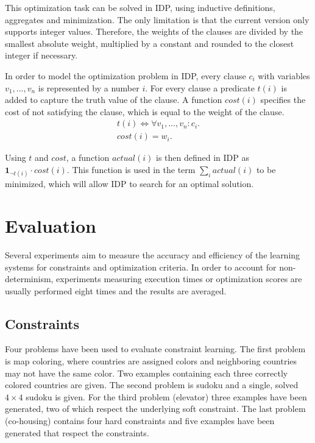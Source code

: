 \documentclass[letterpaper]{article}
\theoremstyle{definition}
\begin{document}
This optimization task can be solved in IDP, using inductive definitions, aggregates and minimization.
The only limitation is that the current version only supports integer values.
Therefore, the weights of the clauses are divided by the smallest absolute weight, multiplied by a constant and rounded to the closest integer if necessary.

In order to model the optimization problem in IDP, every clause $c_i$ with variables $v_1, ..., v_n$ is represented by a number $i$. For every clause a predicate $t(i)$ is added to capture the truth value of the clause.
A function $\mathit{cost}(i)$ specifies the cost of not satisfying the clause, which is equal to the weight of the clause.
\begin{eqnarray*}
  t(i) \Leftrightarrow \forall v_1, ..., v_n : c_i. \\
  cost(i) = w_i.
\end{eqnarray*}

Using $t$ and $\mathit{cost}$, a function $\mathit{actual}(i)$ is then defined in IDP as $\mathbf{1}_{\lnot t(i)} \cdot \mathit{cost}(i)$.
This function is used in the term $\sum_i actual(i)$ to be minimized, which will allow IDP to search for an optimal solution.


\section{Evaluation}
Several experiments aim to measure the accuracy and efficiency of the learning systems for constraints and optimization criteria.
In order to account for non-determinism, experiments measuring execution times or optimization scores are usually performed eight times and the results are averaged.

\subsection{Constraints}
Four problems have been used to evaluate constraint learning.
The first problem is map coloring, where countries are assigned colors and neighboring countries may not have the same color.
Two examples containing each three correctly colored countries are given.
The second problem is sudoku and a single, solved $4 \times 4$ sudoku is given.
For the third problem (elevator) three examples have been generated, two of which respect the underlying soft constraint.
The last problem (co-housing) contains four hard constraints and five examples have been generated that respect the constraints.
\end{document}
